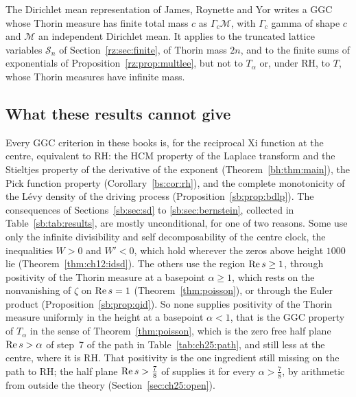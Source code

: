 The Dirichlet mean representation of James, Roynette and Yor \cite{JRY} writes a GGC whose Thorin measure has finite total mass $c$ as $\Gamma_c\mathcal M$, with $\Gamma_c$ gamma of shape $c$ and $\mathcal M$ an independent Dirichlet mean. It applies to the truncated lattice variables $\mathcal S_n$ of Section~\ref{rz:sec:finite}, of Thorin mass $2n$, and to the finite sums of exponentials of Proposition~\ref{rz:prop:multlee}, but not to $T_\alpha$ or, under RH, to $T$, whose Thorin measures have infinite mass.

\subsection{What these results cannot give}\label{sb:sec:cannot}

Every GGC criterion in these books is, for the reciprocal Xi function at the centre, equivalent to RH: the HCM property of the Laplace transform and the Stieltjes property of the derivative of the exponent (Theorem~\ref{bh:thm:main}), the Pick function property (Corollary~\ref{bs:cor:rh}), and the complete monotonicity of the L\'evy density of the driving process (Proposition~\ref{sb:prop:bdlp}). The consequences of Sections~\ref{sb:sec:sd} to \ref{sb:sec:bernstein}, collected in Table~\ref{sb:tab:results}, are mostly unconditional, for one of two reasons. Some use only the infinite divisibility and self decomposability of the centre clock, the inequalities $W>0$ and $W'<0$, which hold wherever the zeros above height $1000$ lie (Theorem~\ref{thm:ch12:idsd}). The others use the region $\operatorname{Re} s\ge1$, through positivity of the Thorin measure at a basepoint $\alpha\ge1$, which rests on the nonvanishing of $\zeta$ on $\operatorname{Re} s=1$ (Theorem~\ref{thm:poisson}), or through the Euler product (Proposition~\ref{sb:prop:qid}). So none supplies positivity of the Thorin measure uniformly in the height at a basepoint $\alpha<1$, that is the GGC property of $T_\alpha$ in the sense of Theorem~\ref{thm:poisson}, which is the zero free half plane $\operatorname{Re} s>\alpha$ of step~7 of the path in Table~\ref{tab:ch25:path}, and still less at the centre, where it is RH. That positivity is the one ingredient still missing on the path to RH; the half plane $\operatorname{Re} s>\frac78$ of \cite{OAI26a} supplies it for every $\alpha>\frac78$, by arithmetic from outside the theory (Section~\ref{sec:ch25:open}).

